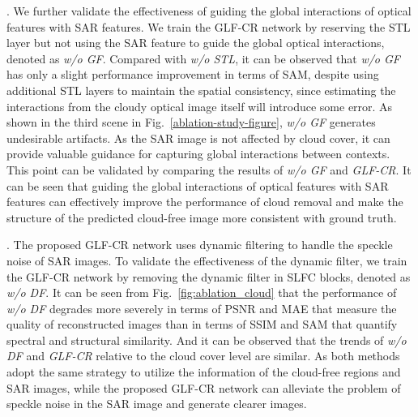\documentclass[a4paper,fleqn]{cas-dc}
\begin{document}
. We further validate the effectiveness of guiding the global interactions of optical features with SAR features.
We train the GLF-CR network by reserving the STL layer but not using the SAR feature to guide the global optical interactions, denoted as {\it w/o GF}.
Compared with {\it w/o STL}, it can be observed that {\it w/o GF} has only a slight performance improvement in terms of SAM, despite using additional STL layers to maintain the spatial consistency, since estimating the interactions from the cloudy optical image itself will introduce some error. As shown in the third scene in Fig.~\ref{ablation-study-figure}, {\it w/o GF} generates undesirable artifacts. As the SAR image is not affected by cloud cover, it can provide valuable guidance for capturing global interactions between contexts. 
This point can be validated by comparing the results of {\it w/o GF} and {\it GLF-CR}. 
It can be seen that guiding the global interactions of optical features with SAR features can effectively improve the performance of cloud removal and make the structure of the predicted cloud-free image more consistent with ground truth.

. The proposed GLF-CR network uses dynamic filtering to handle the speckle noise of SAR images. To validate the effectiveness of the dynamic filter, we train the GLF-CR network by removing the dynamic filter in SLFC blocks, denoted as {\it w/o DF}. 
It can be seen from Fig.~\ref{fig:ablation_cloud} that the performance of {\it w/o DF} degrades more severely in terms of PSNR and MAE that measure the quality of reconstructed images than in terms of SSIM and SAM that quantify spectral and structural similarity. And it can be observed that the trends of {\it w/o DF} and {\it GLF-CR} relative to the cloud cover level are similar. As both methods adopt the same strategy to utilize the information of the cloud-free regions and SAR images, while the proposed GLF-CR network can alleviate the problem of speckle noise in the SAR image and generate clearer images.
\end{document}
